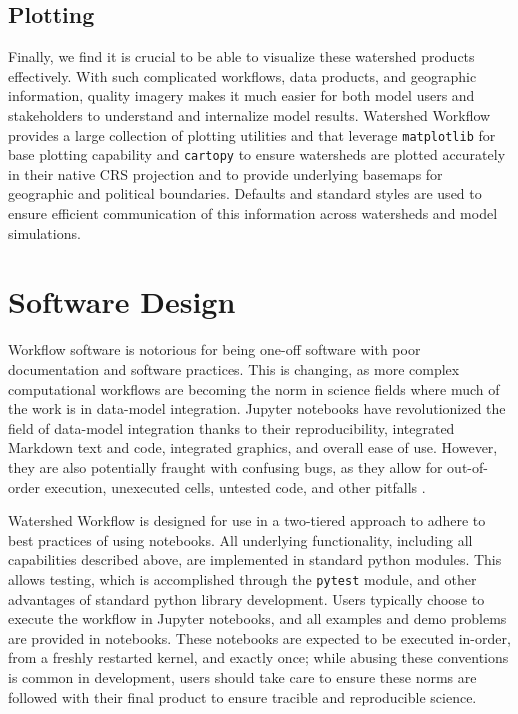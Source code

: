 \documentclass[a4paper,fleqn]{cas-dc}
\newcommand{\code}[1]{\texttt{#1}}
\begin{document}
\subsection{Plotting}
%
Finally, we find it is crucial to be able to visualize these watershed products effectively.
With such complicated workflows, data products, and geographic information, quality imagery makes it much easier for both model users and stakeholders to understand and internalize model results.
Watershed Workflow provides a large collection of plotting utilities and that leverage \code{matplotlib}\cite{} for base plotting capability and \code{cartopy} to ensure watersheds are plotted accurately in their native CRS projection and to provide underlying basemaps for geographic and political boundaries.
Defaults and standard styles are used to ensure efficient communication of this information across watersheds and model simulations.

\section{Software Design}\label{sec:approach}
%
Workflow software is notorious for being one-off software with poor documentation and software practices.
This is changing, as more complex computational workflows are becoming the norm in science fields where much of the work is in data-model integration.
Jupyter notebooks have revolutionized the field of data-model integration thanks to their reproducibility, integrated Markdown text and code, integrated graphics, and overall ease of use.
However, they are also potentially fraught with confusing bugs, as they allow for out-of-order execution, unexecuted cells, untested code, and other pitfalls \cite{????}.

Watershed Workflow is designed for use in a two-tiered approach to adhere to best practices of using notebooks.
All underlying functionality, including all capabilities described above, are implemented in standard python modules.
This allows testing, which is accomplished through the \code{pytest} \cite{pytest} module, and other advantages of standard python library development.
Users typically choose to execute the workflow in Jupyter notebooks, and all examples and demo problems are provided in notebooks.
These notebooks are expected to be executed in-order, from a freshly restarted kernel, and exactly once; while abusing these conventions is common in development, users should take care to ensure these norms are followed with their final product to ensure tracible and reproducible science.
\end{document}
